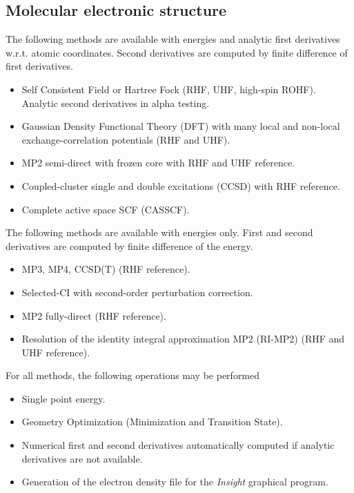 \label{sec:functionality}

\subsection{Molecular electronic structure}

The following methods are available with energies and analytic first
derivatives w.r.t. atomic coordinates.  Second derivatives are
computed by finite difference of first derivatives.
\begin{itemize}
\item Self Consistent Field or Hartree Fock (RHF, UHF, high-spin
  ROHF).  Analytic second derivatives in alpha testing.  
\item Gaussian Density Functional Theory (DFT) with many local and
  non-local exchange-correlation potentials (RHF and UHF).
\item MP2 semi-direct with frozen core with RHF and UHF reference.
\item Coupled-cluster single and double excitations (CCSD) with RHF
  reference.
\item Complete active space SCF (CASSCF).
\end{itemize}

The following methods are available with energies only.  First and
second derivatives are computed by finite difference of the energy.
\begin{itemize}
\item MP3, MP4, CCSD(T) (RHF reference).
\item Selected-CI with second-order perturbation correction.
\item MP2 fully-direct (RHF reference).
\item Resolution of the identity integral approximation MP2 (RI-MP2)
  (RHF and UHF reference).
\end{itemize}

For all methods, the following operations may be performed
\begin{itemize}
\item Single point energy.
\item Geometry Optimization (Minimization and Transition State).
\item Numerical first and second derivatives automatically computed if
  analytic derivatives are not available.
\item Generation of the electron density file for the {\em Insight}
      graphical program.
\end{itemize}

